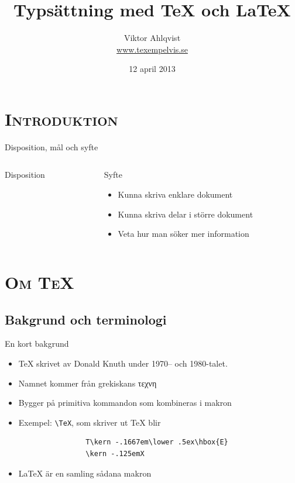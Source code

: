 \documentclass[xcolor=x11names,compress,swedish]{beamer}
\title{Typsättning med TeX och LaTeX}
\author{Viktor Ahlqvist\\\url{www.texempelvis.se}}
\date{12 april 2013}
\begin{document}
\section{\scshape Introduktion}
\begin{frame}
	\titlepage
\end{frame}

\begin{frame}{Disposition, mål och syfte}
	\begin{columns}[t]
		\begin{column}{0.5\textwidth}
			Disposition\\[2em]
			\setcounter{tocdepth}{1}
			{\small
				\tableofcontents
			}
		\end{column}
		\begin{column}{0.5\textwidth}
			Syfte
			\begin{itemize}
				\item Kunna skriva enklare dokument
				\item Kunna skriva delar i större dokument
				\item Veta hur man söker mer information
			\end{itemize}
		\end{column}
	\end{columns}
\end{frame}


\section{\scshape Om TeX}
\subsection{Bakgrund och terminologi}
	\begin{frame}[fragile]{En kort bakgrund}
		\begin{itemize}
			\item TeX skrivet av Donald Knuth under 1970-- och 1980-talet.
			\item Namnet kommer från grekiskans τεχνη
			\item Bygger på primitiva kommandon som kombineras i makron
			\item Exempel: \verb|\TeX|, som skriver ut \TeX{} blir
			\begin{lstlisting}
				T\kern -.1667em\lower .5ex\hbox{E}
				\kern -.125emX
			\end{lstlisting}
			\item LaTeX är en samling sådana makron
		\end{itemize}
	\end{frame}
	
\end{document}
